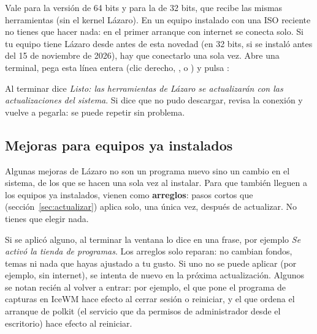 Vale para la versión de 64 bits y para la de 32 bits, que recibe las
mismas herramientas (sin el kernel Lázaro). En un equipo instalado con
una ISO reciente no tienes que hacer nada: en el primer arranque con
internet se conecta solo. Si tu equipo tiene Lázaro desde antes de esta
novedad (en 32 bits, si se instaló antes del 15 de noviembre de 2026),
hay que conectarlo una sola vez. Abre
una terminal, pega esta línea entera (clic derecho, , o
) y pulsa :
\begin{terminal}
\end{terminal}
Al terminar dice \emph{Listo: las herramientas de Lázaro se actualizarán
con las actualizaciones del sistema}. Si dice que no pudo descargar,
revisa la conexión y vuelve a pegarla: se puede repetir sin problema.

\subsection{Mejoras para equipos ya instalados}\label{sec:arreglos}

Algunas mejoras de Lázaro no son un programa nuevo sino un cambio en el
sistema, de los que se hacen una sola vez al instalar. Para que también
lleguen a los equipos ya instalados, vienen como \textbf{arreglos}: pasos
cortos que  (sección~\ref{sec:actualizar})
aplica solo, una única vez, después de actualizar. No tienes que elegir
nada.

Si se aplicó alguno, al terminar la ventana lo dice en una frase, por
ejemplo \emph{Se activó la tienda de programas}. Los arreglos solo
reparan: no cambian fondos, temas ni nada que hayas ajustado a tu gusto.
Si uno no se puede aplicar (por ejemplo, sin internet), se intenta de
nuevo en la próxima actualización. Algunos se notan recién al volver a
entrar: por ejemplo, el que pone el programa de capturas en IceWM hace
efecto al cerrar sesión o reiniciar, y el que ordena el arranque de
polkit (el servicio que da permisos de administrador desde el escritorio)
hace efecto al reiniciar.

\fuentes
